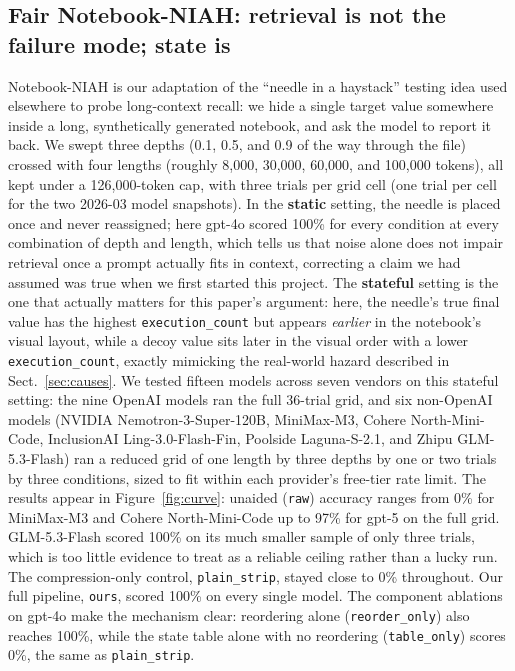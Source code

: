 \documentclass[11pt]{article}
\begin{document}
\subsection{Fair Notebook-NIAH: retrieval is not the failure mode; state is}
\label{sec:niah}
Notebook-NIAH is our adaptation of the ``needle in a haystack'' testing
idea used elsewhere to probe long-context recall: we hide a single target
value somewhere inside a long, synthetically generated notebook, and ask
the model to report it back. We swept three depths (0.1, 0.5, and 0.9 of
the way through the file) crossed with four lengths (roughly 8,000,
30,000, 60,000, and 100,000 tokens), all kept under a 126,000-token cap,
with three trials per grid cell (one trial per cell for the two 2026-03
model snapshots). In the \textbf{static} setting, the needle is placed
once and never reassigned; here gpt-4o scored 100\% for every condition
at every combination of depth and length, which tells us that noise
alone does not impair retrieval once a prompt actually fits in context,
correcting a claim we had assumed was true when we first started this
project. The \textbf{stateful} setting is the one that actually matters
for this paper's argument: here, the needle's true final value has the
highest \texttt{execution\_count} but appears \emph{earlier} in the
notebook's visual layout, while a decoy value sits later in the visual
order with a lower \texttt{execution\_count}, exactly mimicking the
real-world hazard described in Sect.~\ref{sec:causes}. We tested fifteen
models across seven vendors on this stateful setting: the nine OpenAI
models ran the full 36-trial grid, and six non-OpenAI models
(NVIDIA Nemotron-3-Super-120B, MiniMax-M3, Cohere North-Mini-Code,
InclusionAI Ling-3.0-Flash-Fin, Poolside Laguna-S-2.1, and Zhipu
GLM-5.3-Flash) ran a reduced grid of one length by three depths by one
or two trials by three conditions, sized to fit within each provider's
free-tier rate limit. The results appear in Figure~\ref{fig:curve}:
unaided (\texttt{raw}) accuracy ranges from 0\% for MiniMax-M3 and Cohere
North-Mini-Code up to 97\% for gpt-5 on the full grid. GLM-5.3-Flash
scored 100\% on its much smaller sample of only three trials, which is
too little evidence to treat as a reliable ceiling rather than a lucky
run. The compression-only control, \texttt{plain\_strip}, stayed close to
0\% throughout. Our full pipeline, \texttt{ours}, scored 100\% on every
single model. The component ablations on gpt-4o make the mechanism
clear: reordering alone (\texttt{reorder\_only}) also reaches 100\%,
while the state table alone with no reordering (\texttt{table\_only})
scores 0\%, the same as \texttt{plain\_strip}.
\end{document}
